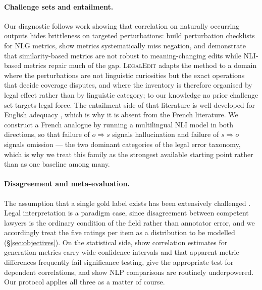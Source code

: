 \documentclass[11pt]{article}
\begin{document}
\paragraph{Challenge sets and entailment.}
Our diagnostic follows work showing that correlation on naturally occurring
outputs hides brittleness on targeted perturbations:
\citet{sai2021perturbation} build perturbation checklists for NLG metrics,
\citet{anschutz2023negation} show metrics systematically miss negation, and
\citet{chen2023menli} demonstrate that similarity-based metrics are not robust
to meaning-changing edits while NLI-based metrics repair much of the gap.
\textsc{LegalEdit} adapts the method to a domain where the perturbations are not
linguistic curiosities but the exact operations that decide coverage disputes,
and where the inventory is therefore organised by legal effect rather than by
linguistic category; to our knowledge no prior challenge set targets legal
force. The entailment side of that literature is well developed for English
adequacy \citep{laban2022summac,zha2023alignscore,fabbri2022qafacteval,rebuffel2021questeval},
which is why it is absent from the French literature. We construct a French
analogue by running a multilingual NLI model
\citep{laurer2024nli,conneau2020xlmr} in both directions, so that failure of
$o \Rightarrow s$ signals hallucination and failure of $s \Rightarrow o$ signals
omission --- the two dominant categories of the legal error taxonomy, which is
why we treat this family as the strongest available starting point rather than
as one baseline among many.

\paragraph{Disagreement and meta-evaluation.}
The assumption that a single gold label exists has been extensively challenged
\citep{pavlick2019inherent,plank2022problem,uma2021learning,peterson2019human}.
Legal interpretation is a paradigm case, since disagreement between competent
lawyers is the ordinary condition of the field rather than annotator error, and
we accordingly treat the five ratings per item as a distribution to be modelled
(\S\ref{sec:objectives}). On the statistical side,
\citet{deutsch2021statistical} show correlation estimates for generation metrics
carry wide confidence intervals and that apparent metric differences frequently
fail significance testing, \citet{graham2014williams} give the appropriate test
for dependent correlations, and \citet{card2020power} show NLP comparisons are
routinely underpowered. Our protocol applies all three as a matter of course.
\end{document}
